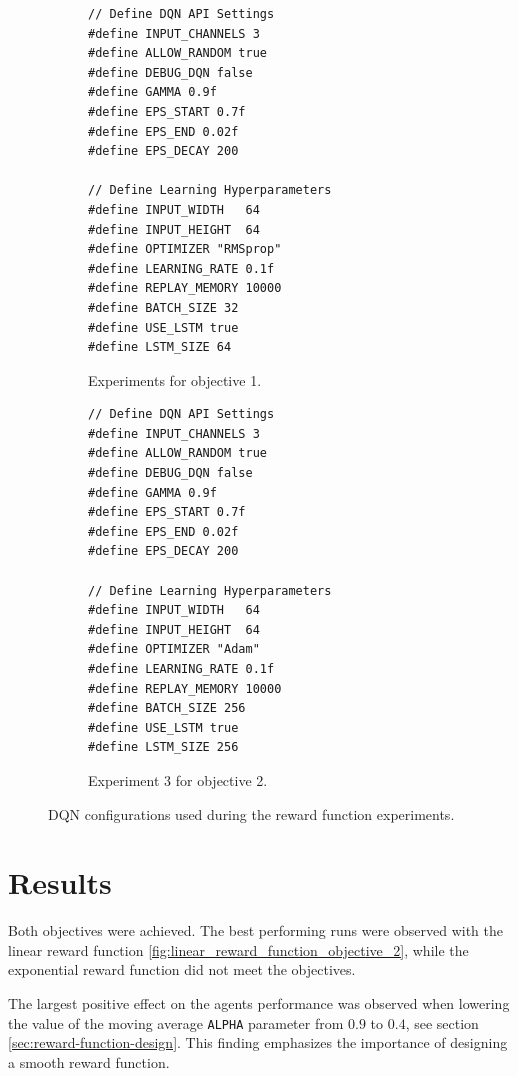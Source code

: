 \documentclass[11pt, onecolumn, oneside, reqno]{amsart}
\begin{document}
\begin{figure}[thpb]
\centering
\begin{subfigure}{.49\textwidth}
\begin{lstlisting}
// Define DQN API Settings
#define INPUT_CHANNELS 3
#define ALLOW_RANDOM true
#define DEBUG_DQN false
#define GAMMA 0.9f
#define EPS_START 0.7f
#define EPS_END 0.02f
#define EPS_DECAY 200

// Define Learning Hyperparameters
#define INPUT_WIDTH   64
#define INPUT_HEIGHT  64
#define OPTIMIZER "RMSprop"
#define LEARNING_RATE 0.1f
#define REPLAY_MEMORY 10000
#define BATCH_SIZE 32
#define USE_LSTM true
#define LSTM_SIZE 64
\end{lstlisting}
\caption{Experiments for objective 1.}
\label{fig:fixed_dqn_params_objective_1}
\end{subfigure}
\begin{subfigure}{.49\textwidth}
\begin{lstlisting}
// Define DQN API Settings
#define INPUT_CHANNELS 3
#define ALLOW_RANDOM true
#define DEBUG_DQN false
#define GAMMA 0.9f
#define EPS_START 0.7f
#define EPS_END 0.02f
#define EPS_DECAY 200

// Define Learning Hyperparameters
#define INPUT_WIDTH   64
#define INPUT_HEIGHT  64
#define OPTIMIZER "Adam"
#define LEARNING_RATE 0.1f
#define REPLAY_MEMORY 10000
#define BATCH_SIZE 256
#define USE_LSTM true
#define LSTM_SIZE 256
\end{lstlisting}
\caption{Experiment 3 for objective 2.}
\label{fig:fixed_dqn_params_exp_3_objective_2}
\end{subfigure}
\caption{DQN configurations used during the reward function experiments.}
\label{fig:dqn_params}
\end{figure}

\section{Results}
\label{sec:results}
Both objectives were achieved. The best performing runs were observed with the linear reward function \ref{fig:linear_reward_function_objective_2}, while the exponential reward function did not meet the objectives.

The largest positive effect on the agents performance was observed when lowering the value of the moving average \texttt{ALPHA} parameter from $0.9$ to $0.4$, see section \ref{sec:reward-function-design}. This finding emphasizes the importance of designing a smooth reward function.
\end{document}
